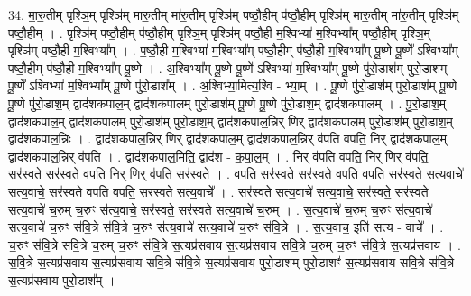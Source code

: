 \documentclass[17pt]{extarticle}
\begin{document}
34. मा॒रु॒तीम् पृश्ञि॒म् पृश्ञि॑म् मारु॒तीम् मा॑रु॒तीम् पृश्ञि॑म् पष्ठौ॒हीम् प॑ष्ठौ॒हीम् पृश्ञि॑म् मारु॒तीम् मा॑रु॒तीम् पृश्ञि॑म् पष्ठौ॒हीम् । . पृश्ञि॑म् पष्ठौ॒हीम् प॑ष्ठौ॒हीम् पृश्ञि॒म् पृश्ञि॑म् पष्ठौ॒ही म॒श्विभ्या॑ म॒श्विभ्या᳚म् पष्ठौ॒हीम् पृश्ञि॒म् पृश्ञि॑म् पष्ठौ॒ही म॒श्विभ्या᳚म् । . प॒ष्ठौ॒ही म॒श्विभ्या॑ म॒श्विभ्या᳚म् पष्ठौ॒हीम् प॑ष्ठौ॒ही म॒श्विभ्या᳚म् पू॒ष्णे पू॒ष्णे᳚ ऽश्विभ्या᳚म् पष्ठौ॒हीम् प॑ष्ठौ॒ही म॒श्विभ्या᳚म् पू॒ष्णे । . अ॒श्विभ्या᳚म् पू॒ष्णे पू॒ष्णे᳚ ऽश्विभ्या॑ म॒श्विभ्या᳚म् पू॒ष्णे पु॑रो॒डाश॑म् पुरो॒डाश॑म् पू॒ष्णे᳚ ऽश्विभ्या॑ म॒श्विभ्या᳚म् पू॒ष्णे पु॑रो॒डाश᳚म् । . अ॒श्विभ्या॒मित्य॒श्वि - भ्या॒म् । . पू॒ष्णे पु॑रो॒डाश॑म् पुरो॒डाश॑म् पू॒ष्णे पू॒ष्णे पु॑रो॒डाश॒म् द्वाद॑शकपाल॒म् द्वाद॑शकपालम् पुरो॒डाश॑म् पू॒ष्णे पू॒ष्णे पु॑रो॒डाश॒म् द्वाद॑शकपालम् । . पु॒रो॒डाश॒म् द्वाद॑शकपाल॒म् द्वाद॑शकपालम् पुरो॒डाश॑म् पुरो॒डाश॒म् द्वाद॑शकपाल॒न्निर् णिर् द्वाद॑शकपालम् पुरो॒डाश॑म् पुरो॒डाश॒म् द्वाद॑शकपाल॒न्निः । . द्वाद॑शकपाल॒न्निर् णिर् द्वाद॑शकपाल॒म् द्वाद॑शकपाल॒न्निर् व॑पति वपति॒ निर् द्वाद॑शकपाल॒म् द्वाद॑शकपाल॒न्निर् व॑पति । . द्वाद॑शकपाल॒मिति॒ द्वाद॑श - क॒पा॒ल॒म् । . निर् व॑पति वपति॒ निर् णिर् व॑पति॒ सर॑स्वते॒ सर॑स्वते वपति॒ निर् णिर् व॑पति॒ सर॑स्वते । . व॒प॒ति॒ सर॑स्वते॒ सर॑स्वते वपति वपति॒ सर॑स्वते सत्य॒वाचे॑ सत्य॒वाचे॒ सर॑स्वते वपति वपति॒ सर॑स्वते सत्य॒वाचे᳚ । . सर॑स्वते सत्य॒वाचे॑ सत्य॒वाचे॒ सर॑स्वते॒ सर॑स्वते सत्य॒वाचे॑ च॒रुम् च॒रुꣳ स॑त्य॒वाचे॒ सर॑स्वते॒ सर॑स्वते सत्य॒वाचे॑ च॒रुम् । . स॒त्य॒वाचे॑ च॒रुम् च॒रुꣳ स॑त्य॒वाचे॑ सत्य॒वाचे॑ च॒रुꣳ स॑वि॒त्रे स॑वि॒त्रे च॒रुꣳ स॑त्य॒वाचे॑ सत्य॒वाचे॑ च॒रुꣳ स॑वि॒त्रे । . स॒त्य॒वाच॒ इति॑ सत्य - वाचे᳚ । . च॒रुꣳ स॑वि॒त्रे स॑वि॒त्रे च॒रुम् च॒रुꣳ स॑वि॒त्रे स॒त्यप्र॑सवाय स॒त्यप्र॑सवाय सवि॒त्रे च॒रुम् च॒रुꣳ स॑वि॒त्रे स॒त्यप्र॑सवाय । . स॒वि॒त्रे स॒त्यप्र॑सवाय स॒त्यप्र॑सवाय सवि॒त्रे स॑वि॒त्रे स॒त्यप्र॑सवाय पुरो॒डाश॑म् पुरो॒डाशꣳ॑ स॒त्यप्र॑सवाय सवि॒त्रे स॑वि॒त्रे स॒त्यप्र॑सवाय पुरो॒डाश᳚म् । \newline
\end{document}
